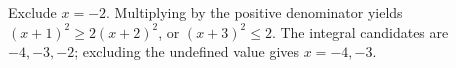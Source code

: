 Exclude $ x=-2 $. Multiplying by the positive denominator yields $(x+1)^2\ge2(x+2)^2 $, or $(x+3)^2\le2 $. The integral candidates are $-4,-3,-2 $; excluding the undefined value gives $\boxed{x=-4,-3}$.
